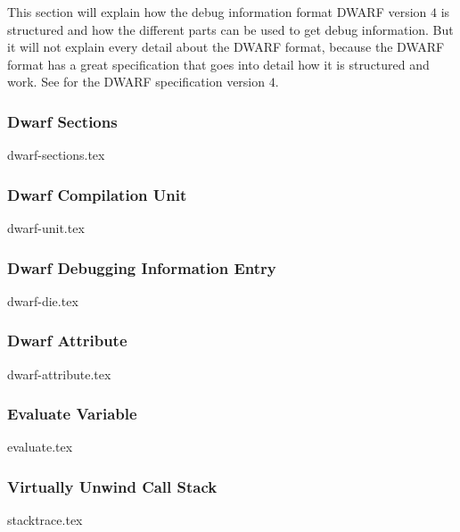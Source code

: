  


This section will explain how the debug information format \acrfull{DWARF} version $4$ is structured and how the different parts can be used to get debug information.
But it will not explain every detail about the \gls{DWARF} format, because the \gls{DWARF} format has a great specification that goes into detail how it is structured and work.
See \cite{dwarf} for the \gls{DWARF} specification version $4$.


\subsubsection{Dwarf Sections}
{dwarf-sections.tex}


\subsubsection{Dwarf Compilation Unit}
{dwarf-unit.tex}


\subsubsection{Dwarf Debugging Information Entry}
{dwarf-die.tex}


\subsubsection{Dwarf Attribute}
{dwarf-attribute.tex}


\subsubsection{Evaluate Variable}
\label{sec:evaluate-variable}
{evaluate.tex}


\subsubsection{Virtually Unwind Call Stack}
\label{sec:stacktrace}
{stacktrace.tex}

